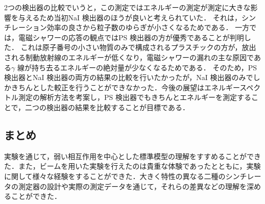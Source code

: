 2つの検出器の比較でいうと，この測定ではエネルギーの測定が測定に大きな影響を与えるため当初NaI 検出器のほうが良いと考えられていた．
それは，シンチレーション効率の良さから粒子数のゆらぎが小さくなるためである．
一方では，電磁シャワーの応答の観点ではPS 検出器の方が優秀であることが判明した．
これは原子番号の小さい物質のみで構成されるプラスチックの方が，放出される制動放射線のエネルギーが低くなり，電磁シャワーの漏れの主な原因である$\gamma$ 線が持ち去るエネルギーの絶対量が少なくなるためである．
そのため，PS 検出器とNaI 検出器の両方の結果の比較を行いたかったが，NaI 検出器のみでしかきちんとした較正を行うことができなかった．今後の展望はエネルギースペクトル測定の解析方法を考案し，PS 検出器でもきちんとエネルギーを測定することで，二つの検出器の結果を比較することが目標である．

\subsection{まとめ}
実験を通じて，弱い相互作用を中心とした標準模型の理解をすすめることができた．また，ビームを用いた実験を行えたのは貴重な体験であったとともに，実験に関して様々な経験をすることができた．大きく特性の異なる二種のシンチレータの測定器の設計や実際の測定データを通じて，それらの差異などの理解を深めることができた．
